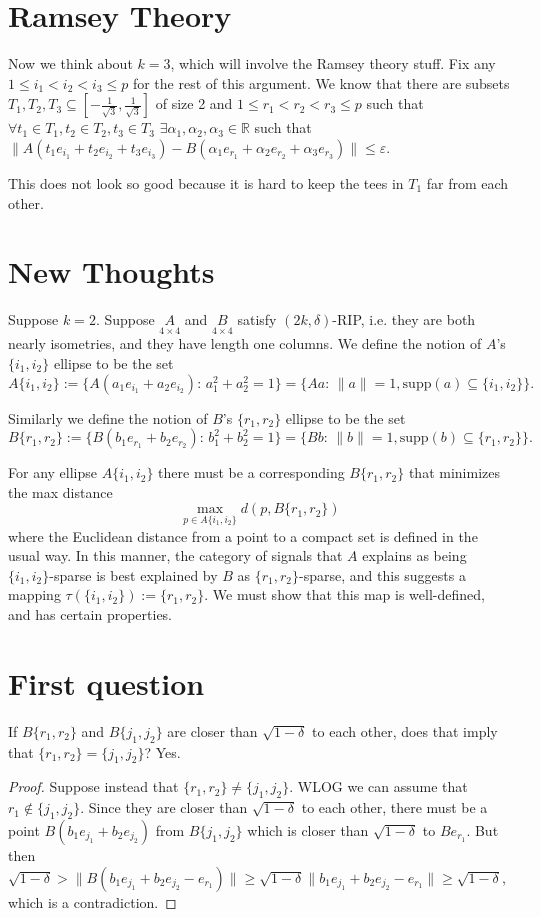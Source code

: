 \documentclass[11pt]{amsart}
\begin{document}
\section{Ramsey Theory}
Now we think about $k=3$, which will involve the Ramsey theory stuff.
Fix any $1\leq i_1 < i_2 < i_3 \leq p$ for the rest of this argument.
We know that there are subsets $T_1,T_2,T_3 \subseteq [-\frac{1}{\sqrt{3}},\frac{1}{\sqrt{3}}]$ of size 2 and $1\leq r_1 < r_2 < r_3\leq p$ such that  
$\forall t_1 \in T_1, t_2 \in T_2, t_3 \in T_3$ $\exists \alpha_1, \alpha_2, \alpha_3\in \mathbb{R}$ such that 
$\|A(t_1e_{i_1}+t_2 e_{i_2}+t_3e_{i_3})-B(\alpha_1e_{r_1}+\alpha_2 e_{r_2}+\alpha_3 e_{r_3})\|\leq \varepsilon$.

This does not look so good because it is hard to keep the tees in $T_1$ far from each other.

\section{New Thoughts}
Suppose $k=2$.  Suppose  $\underset{4\times 4}{A}$ and $\underset{4\times 4}{B}$ satisfy $(2k,\delta)$-RIP, i.e. they are both
nearly isometries, and they have length one columns.  We define the notion of $A$'s $\{i_1,i_2\}$ ellipse to be the set
\[A\{i_1,i_2\}:=\{A(a_1e_{i_1}+a_2e_{i_2}):\, a_1^2+a_2^2=1\}=\{Aa:\, \|a\|=1, \text{supp}(a)\subseteq \{i_1,i_2\}\}.\]

Similarly we define the notion of $B$'s $\{r_1,r_2\}$ ellipse to be the set
\[B\{r_1,r_2\}:=\{B(b_1e_{r_1}+b_2e_{r_2}):\, b_1^2+b_2^2=1\}=\{Bb:\, \|b\|=1, \text{supp}(b)\subseteq \{r_1,r_2\}\}.\]

For any ellipse $A\{i_1,i_2\}$ there must be a corresponding $B\{r_1,r_2\}$ that minimizes the max distance 
\begin{equation}\underset{p\in A\{i_1,i_2\}}{\max} d(p, B\{r_1,r_2\})\end{equation}
where the Euclidean distance from a point to a compact set is defined in the usual way.
In this manner, the category of signals that $A$ explains as being $\{i_1,i_2\}$-sparse is best explained by 
$B$ as $\{r_1,r_2\}$-sparse, and this suggests a mapping $\tau(\{i_1,i_2\}):=\{r_1,r_2\}$.   We must show that
this map is well-defined, and has certain properties.  
\section{First question} 
If  $B\{r_1,r_2\}$ and $B\{j_1,j_2\}$ are closer than $\sqrt{1-\delta}$  to
each other, does that imply that $\{r_1,r_2\}=\{j_1,j_2\}$?  Yes.
\begin{proof}
Suppose instead that $\{r_1,r_2\}\neq \{j_1,j_2\}$.
WLOG we can assume that $r_1\notin \{j_1,j_2\}$.  Since they are closer than $\sqrt{1-\delta}$ to each other, there 
must be a point $B(b_1e_{j_1}+b_2e_{j_2})$ from $B\{j_1,j_2\}$ which is closer than $\sqrt{1-\delta}$ to $Be_{r_1}$.
But then $\sqrt{1-\delta}> \|B(b_1e_{j_1}+b_2e_{j_2}-e_{r_1})\|\geq \sqrt{1-\delta} \|b_1e_{j_1}+b_2e_{j_2}-e_{r_1}\| \geq \sqrt{1-\delta}$,
which is a contradiction.  
\end{proof}
\end{document}
